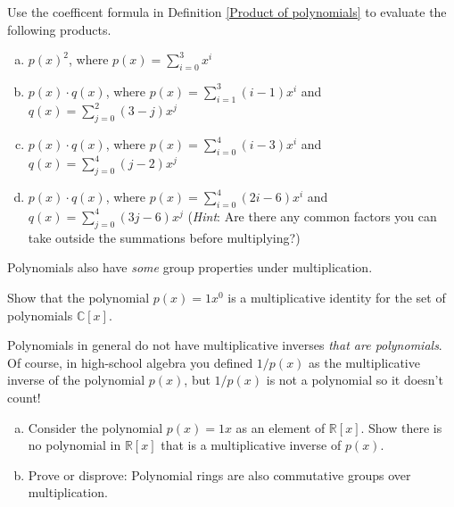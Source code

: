 \begin {exercise}{}
Use the coefficent formula in Definition \ref{Product of polynomials} to evaluate the following products.
\begin {enumerate}[(a)]
\item
$p(x)^2$, where $p(x) = \sum_{i=0}^{3} x^i$
\item
$p(x) \cdot q(x)$, where $p(x) = \sum_{i=1}^{3} (i-1)x^i$  and $q(x) = \sum_{j=0}^{2} (3-j)x^j$
\item
$p(x) \cdot q(x)$, where $p(x) = \sum_{i=0}^{4} (i-3)x^i$  and $q(x) = \sum_{j=0}^{4} (j-2)x^j$ 
\item
$p(x) \cdot q(x)$, where $p(x) = \sum_{i=0}^{4} (2i-6)x^i$  and $q(x) = \sum_{j=0}^{4} (3j-6)x^j$ (\emph{Hint}: Are there any common factors you can take outside 
the summations before multiplying?)
\end{enumerate}
\end {exercise}


Polynomials also have \emph{some} group properties under multiplication.

\begin{exercise}
Show that the polynomial $p(x) = 1x^0$ is a multiplicative identity for the set of polynomials $\mathbb{C}[x]$.
\end{exercise}

Polynomials in general do not have multiplicative inverses \emph{that are polynomials}.  Of course, in high-school algebra you defined $1/p(x)$ as the multiplicative inverse of the polynomial $p(x)$, but $1/p(x)$ is not a polynomial so it doesn't count!

\begin{exercise}
\begin{enumerate}[(a)]
\item
Consider the  polynomial $p(x)= 1x$ as an element of $\mathbb{R}[x]$. Show there is no polynomial in $\mathbb{R}[x]$ that is a multiplicative inverse of $p(x)$.
\item
Prove or disprove: Polynomial rings are also commutative groups over multiplication.
\end{enumerate}
\end{exercise}

